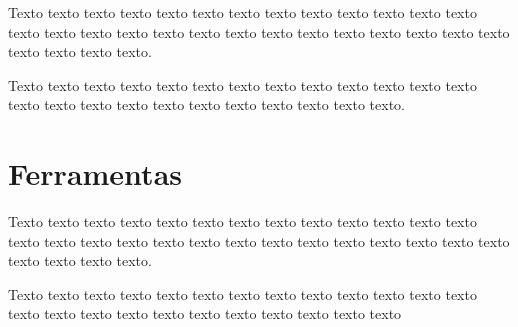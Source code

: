     Texto texto texto texto texto texto texto texto texto texto texto texto
    texto texto texto texto texto texto texto texto texto texto texto texto
    texto texto texto texto texto texto texto.


    Texto texto texto texto texto texto texto texto texto texto texto texto
    texto texto texto texto texto texto texto texto texto texto texto texto.

\section{Ferramentas}
\label{sec:ferramentas}

    Texto texto texto texto texto texto texto texto texto texto texto texto
    texto texto texto texto texto texto texto texto texto texto texto texto
    texto texto texto texto texto texto texto.


    Texto texto texto texto texto texto texto texto texto texto texto texto
    texto texto texto texto texto texto texto texto texto texto texto texto

